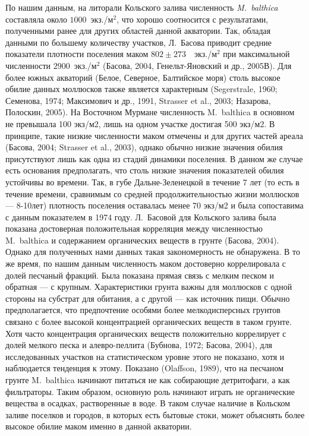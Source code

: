 По нашим данным, на литорали Кольского залива численность {\it M.~balthica} составляла около $1000$~экз./м$^2$, что хорошо соотносится с результатами, полученными ранее для других областей данной акватории. 
Так, обладая данными по большему количеству участков, Л. Басова приводит средние показатели плотности поселения маком $802 \pm 273$~~экз./м$^2$ при максимальной численности $2900$~экз./м$^2$ (Басова, 2004, Генельт-Яновский и др., 2005В). 
Для более южных акваторий (Белое, Северное, Балтийское моря) столь высокое обилие данных моллюсков также является характерным (Segerstrale, 1960; Семенова, 1974; Максимович и др., 1991, Strasser et al., 2003; Назарова, Полоскин, 2005). На Восточном Мурмане численность M. balthica в основном не превышала 100 экз/м2, лишь на одном участке достигая 500 экз/м2. В принципе, такие низкие численности маком отмечены и для других частей ареала (Басова, 2004; Strasser et al., 2003), однако обычно низкие значения обилия присутствуют лишь как одна из стадий динамики поселения. В данном же случае есть основания предполагать, что столь низкие значения показателей обилия устойчивы во времени. Так, в губе Дальне-Зеленецкой в течение 7 лет (то есть в течение времени, сравнимым со средней продолжительностью жизни моллюсков — 8-10лет) плотность поселения	оставалась менее 70 экз/м2 и была сопоставима с данным показателем в 1974 году. 
	Л. Басовой для Кольского залива была показана достоверная положительная корреляция между численностью M. balthica и содержанием органических веществ в грунте (Басова, 2004).   Однако для полученных нами данных такая закономерность не обнаружена. В то же время, по нашим данным численность маком достоверно коррелировала с долей песчаный фракций. Была показана прямая связь с мелким песком и обратная — с крупным. Характеристики грунта важны для моллюсков с одной стороны на субстрат для обитания, а с другой — как источник пищи. Обычно предполагается, что предпочтение особями более мелкодисперсных грунтов связано с более высокой концентрацией органических веществ в таком грунте. Хотя часто концентрация органических веществ положительно коррелирует с долей мелкого песка и алевро-пеллита (Бубнова, 1972; Басова, 2004), для исследованных участков на статистическом уровне этого не показано, хотя и наблюдается тенденция к этому. 	Показано (Olaffson, 1989), что на песчаном грунте M. balthica начинают питаться не как собирающие детритофаги, а как фильтраторы. Таким образом, основную роль начинают играть не органические вещества в осадках, растворенные в воде. В таком случае наличие в Кольском заливе поселков и городов, в которых есть бытовые стоки, может объяснять более высокое обилие маком именно в данной акватории.





